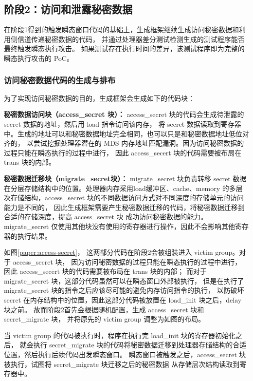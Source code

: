 \subsection{阶段2：访问和泄露秘密数据}

在阶段1得到的触发瞬态窗口代码的基础上，生成框架继续生成访问秘密数据和利用侧信道传递秘密数据的代码，
并通过处理器差分测试检测生成的测试程序能否最终触发瞬态执行攻击。
如果测试存在执行时间的差异，该测试程序即为完整的瞬态执行攻击的 PoC。

\subsubsection{访问秘密数据代码的生成与排布}

为了实现访问秘密数据的目的，生成框架会生成如下的代码块：\par

\textbf{秘密数据访问块（access\_secret 块）：}
access\_secret 块的代码会生成待泄露的 secret 数据的地址，然后用 load 指令访问该内存，
将 secret 数据读取到寄存器中。生成的地址可以和秘密数据地址完全相同，也可以只是和秘密数据地址低位对齐的，
以尝试挖掘处理器潜在的 MDS 内存地址匹配漏洞。因为访问秘密数据的过程只能在瞬态执行的过程中进行，
因此 access\_secert 块的代码需要被布局在 trans 块的内部。\par

\textbf{秘密数据迁移块（migrate\_secret块）：}
migrate\_secret 块负责转移 secret 数据在分层存储结构中的位置。处理器内存采用load缓冲区、cache、memory
的多层次存储结构，access\_secret 块的不同数据访问方式对不同深度的存储单元的访问能力是不同的，
因此生成框架需要产生秘密数据迁移的代码，将秘密数据迁移到合适的存储深度，提高 access\_secret 块
成功访问秘密数据的能力。migrate\_secret 仅使用其他块没有使用的寄存器进行操作，因此不会影响其他寄存器的执行结果。\par

如图\ref{paper:access-secret}，
这两部分代码在阶段2会被组装进入 victim group。对于 access\_secret 块，
因为访问秘密数据的过程只能在瞬态执行的过程中进行，
因此 access\_secert 块的代码需要被布局在 trans 块的内部；
而对于 migrate\_secret 块，这部分代码虽然可以在瞬态窗口外部被执行，
但是在执行了 migrate\_secret 块的指令之后应该尽可能的避免内存访问指令的执行，
以防破坏 secret 在内存结构中的位置，因此这部分代码被放置在 load\_init 块之后，delay 块之前。
故而阶段2首先会根据随机配置，生成 access\_secret 块和 secret\_migrate 块，
并将原先的 victim group 调整为如图的布局。\par

当 victim group 的代码被执行时，程序在执行完 load\_init 块的寄存器初始化之后，
就会执行 secret\_migrate 块的代码将秘密数据迁移到处理器存储结构的合适位置，然后执行后续代码出发瞬态窗口。
瞬态窗口被触发之后，access\_secret 块被执行，试图将 secret\_migrate 块迁移之后的秘密数据
从存储层次结构读取到寄存器中。\par

